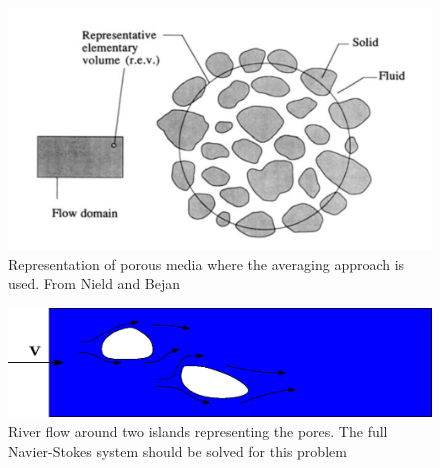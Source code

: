 \begin{center}
\begin{figure}[!ht]
\includegraphics[scale=0.3]{figures/Porous_REV}
\caption{Representation of porous media where the averaging approach is used. From Nield and Bejan}
\end{figure}
\end{center}
\begin{center}
\begin{figure}[!ht]
\includegraphics[width=0.9\linewidth]{figures/Porous_Islands}
\caption{River flow around two islands representing the pores. The full Navier-Stokes system should be solved for this problem}
\end{figure}
\end{center}
